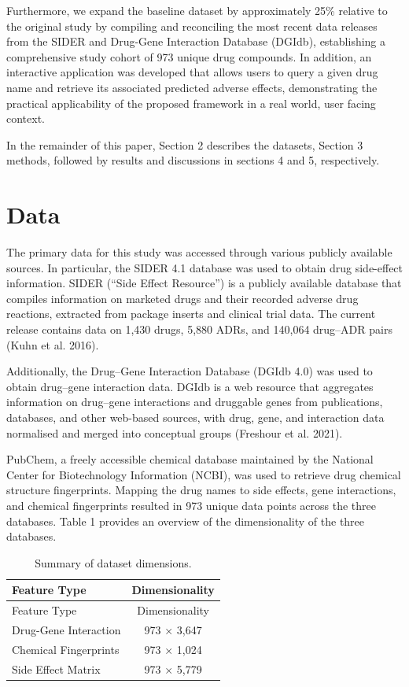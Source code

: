 \documentclass{article}
\begin{document}
Furthermore, we expand the baseline dataset by approximately 25\%
relative to the original study by compiling and reconciling the most
recent data releases from the SIDER and Drug-Gene Interaction Database
(DGIdb), establishing a comprehensive study cohort of 973 unique drug
compounds. In addition, an interactive application was developed that
allows users to query a given drug name and retrieve its associated
predicted adverse effects, demonstrating the practical applicability of
the proposed framework in a real world, user facing context.

In the remainder of this paper, Section 2 describes the datasets,
Section 3 methods, followed by results and discussions in sections 4 and
5, respectively.

\section{Data}\label{data}

The primary data for this study was accessed through various publicly
available sources. In particular, the SIDER 4.1 database was used to
obtain drug side-effect information. SIDER (``Side Effect Resource'') is
a publicly available database that compiles information on marketed
drugs and their recorded adverse drug reactions, extracted from package
inserts and clinical trial data. The current release contains data on
1,430 drugs, 5,880 ADRs, and 140,064 drug--ADR pairs (Kuhn et al. 2016).

Additionally, the Drug--Gene Interaction Database (DGIdb 4.0) was used
to obtain drug--gene interaction data. DGIdb is a web resource that
aggregates information on drug--gene interactions and druggable genes
from publications, databases, and other web-based sources, with drug,
gene, and interaction data normalised and merged into conceptual groups
({Freshour et al.} 2021).

PubChem, a freely accessible chemical database maintained by the
National Center for Biotechnology Information (NCBI), was used to
retrieve drug chemical structure fingerprints. Mapping the drug names to
side effects, gene interactions, and chemical fingerprints resulted in
973 unique data points across the three databases. Table 1 provides an
overview of the dimensionality of the three databases.

\begin{longtable}[]{@{}lc@{}}
\caption{Summary of dataset dimensions.}\tabularnewline
\toprule\noalign{}
Feature Type & Dimensionality \\
\midrule\noalign{}
\endfirsthead
\toprule\noalign{}
Feature Type & Dimensionality \\
\midrule\noalign{}
\endhead
\bottomrule\noalign{}
\endlastfoot
Drug-Gene Interaction & 973 × 3,647 \\
Chemical Fingerprints & 973 × 1,024 \\
Side Effect Matrix & 973 × 5,779 \\
\end{longtable}
\end{document}
